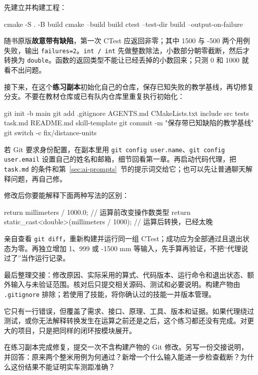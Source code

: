 \begin{example}[走完一次修复与交付]
先建立并构建工程：
\begin{tbash}
cmake -S . -B build
cmake --build build
ctest --test-dir build --output-on-failure
\end{tbash}
随书原版\textbf{故意带有缺陷}，第一次 CTest 应返回非零；其中 1500 与 -500 两个用例失败，输出 \texttt{failures=2}。\texttt{int / int} 先做整数除法，小数部分朝零截断，然后才转换为 \texttt{double}。函数的返回类型不能让已经丢掉的小数回来；只测 0 和 1000 就看不出问题。

接下来，在这个\textbf{练习副本}初始化自己的仓库，保存已知失败的教学基线，再切修复分支。不要在教材仓库或已有队内仓库里重复执行初始化：
\begin{tbash}
git init -b main
git add .gitignore AGENTS.md CMakeLists.txt include src tests task.md README.md skill-template
git commit -m "保存带已知缺陷的教学基线"
git switch -c fix/distance-units
\end{tbash}
若 Git 要求身份配置，在副本里用 \texttt{git config user.name}、\texttt{git config user.email} 设置自己的姓名和邮箱，细节回看第一章。再启动代码代理，把 \texttt{task.md} 的条件和第~\ref{sec:ai-prompts}~节的提示词交给它；也可以先让普通聊天解释问题，再自己修。

修改后你要能解释下面两种写法的区别：
\begin{tcpp}
return millimeters / 1000.0;  // 运算前改变操作数类型
return static_cast<double>(millimeters / 1000);  // 运算后转换，已经太晚
\end{tcpp}
亲自查看 \texttt{git diff}，重新构建并运行同一组 CTest；成功应为全部通过且退出状态为零。再独立增加 1、999 或 -1500 mm 等输入，先手算再验证，不把“代理说过了”当作运行记录。

最后整理交接：修改原因、实际采用的算式、代码版本、运行命令和退出状态、额外输入与未验证范围。核对后只提交相关源码、测试和必要说明。构建产物由 \texttt{.gitignore} 排除；若使用了技能，将你确认过的技能一并版本管理。
\end{example}

它只有一行错误，但覆盖了需求、接口、原理、工具、版本和证据。如果代理绕过测试，或你无法解释转换发生在运算之前还是之后，这个练习都还没有完成。对更大的项目，只是把同样的闭环按模块展开。

\begin{exercise}\label{ex:ai-lab}
在练习副本完成修复，提交一次不含构建产物的 Git 修改。另写一份交接说明，并回答：原来两个整米用例为何通过？新增一个什么输入能进一步检查截断？为什么这份结果不能证明实车测距准确？
\end{exercise}
